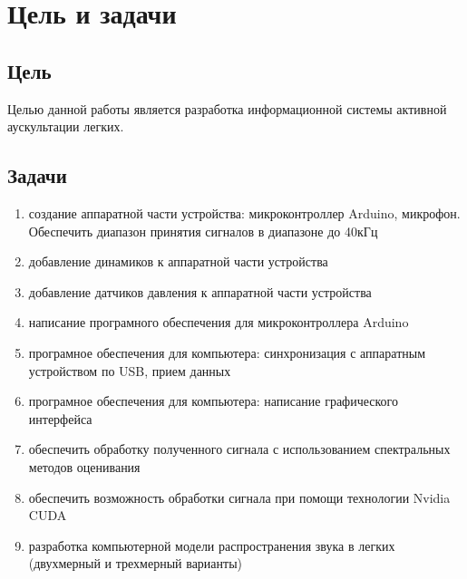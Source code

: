 \documentclass[../main.tex]{subfiles}
\begin{document}
\section{Цель и задачи}

\subsection{Цель}
Целью данной работы является разработка информационной системы активной аускультации легких.

\subsection{Задачи}
\begin{enumerate}
    \item создание аппаратной части устройства: микроконтроллер Arduino, микрофон. Обеспечить диапазон принятия сигналов в диапазоне до 40кГц
    \item добавление динамиков к аппаратной части устройства
    \item добавление датчиков давления к аппаратной части устройства 
    \item написание програмного обеспечения для микроконтроллера Arduino
    \item програмное обеспечения для компьютера: синхронизация с аппаратным устройством по USB, прием данных
    \item програмное обеспечения для компьютера: написание графического интерфейса
    \item обеспечить обработку полученного сигнала с использованием спектральных методов оценивания
    \item обеспечить возможность обработки сигнала при помощи технологии Nvidia CUDA
    \item разработка компьютерной модели распространения звука в легких (двухмерный и трехмерный варианты)
\end{enumerate}
\newpage
\end{document}
